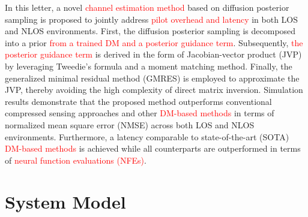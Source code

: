 \documentclass[lettersize,journal]{IEEEtran}
\newcommand{\tred}{\textcolor{red}}
\begin{document}
In this letter, a novel \tred{channel estimation method} based on diffusion posterior sampling is proposed to jointly address \tred{pilot overhead and latency} in both LOS and NLOS environments. First, the diffusion posterior sampling is decomposed into a prior \tred{from a trained DM and a posterior guidance term}. Subsequently, \tred{the posterior guidance term} is derived in the form of Jacobian-vector product (JVP) by leveraging Tweedie's formula and a moment matching method. Finally, the generalized minimal residual method (GMRES) is employed to approximate the JVP, thereby avoiding the high complexity of direct matrix inversion. Simulation results demonstrate that the proposed method outperforms conventional compressed sensing approaches and other \tred{DM-based methods} in terms of normalized mean square error (NMSE) across both LOS and NLOS environments. Furthermore, a latency comparable to state-of-the-art (SOTA) \tred{DM-based methods} is achieved while all counterparts are outperformed in terms of \tred{neural function evaluations (NFEs)}.

\section{System Model}
\end{document}
